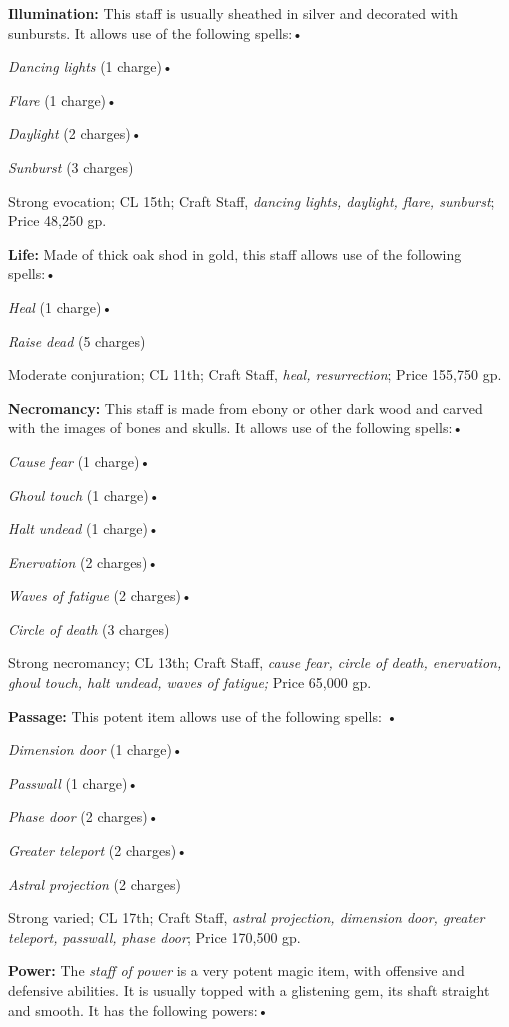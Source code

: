 \textbf{Illumination: }This staff is usually sheathed in silver and decorated with 
sunbursts. It allows use of the following spells:•

\textit{Dancing lights }(1 charge)•

\textit{Flare }(1 charge)•

\textit{Daylight }(2 charges)•

\textit{Sunburst }(3 charges)

Strong evocation; CL 15th; Craft Staff, \textit{dancing lights, daylight, flare, 
sunburst}; Price 48,250 gp.

\textbf{Life:} Made of thick oak shod in gold, this staff allows use of the following 
spells:•

\textit{Heal }(1 charge)•

\textit{Raise dead }(5 charges)

Moderate conjuration; CL 11th; Craft Staff, \textit{heal, resurrection}; Price 
155,750 gp.

\textbf{Necromancy: }This staff is made from ebony or other dark wood and carved 
with the images of bones and skulls. It allows use of the following spells:•

\textit{Cause fear }(1 charge)•

\textit{Ghoul touch }(1 charge)•

\textit{Halt undead }(1 charge)•

\textit{Enervation }(2 charges)•

\textit{Waves of fatigue }(2 charges)•

\textit{Circle of death }(3 charges)

Strong necromancy; CL 13th; Craft Staff, \textit{cause fear, circle of death, enervation, 
ghoul touch, halt undead, waves of fatigue; }Price 65,000 gp.

\textbf{Passage:} This potent item allows use of the following spells: •

\textit{Dimension door }(1 charge)•

\textit{Passwall }(1 charge)•

\textit{Phase door }(2 charges)•

\textit{Greater teleport }(2 charges)•

\textit{Astral projection }(2 charges)

Strong varied; CL 17th; Craft Staff, \textit{astral projection, dimension door, 
greater teleport, passwall, phase door}; Price 170,500 gp.

\textbf{Power:} The \textit{staff of power }is a very potent magic item, with offensive 
and defensive abilities. It is usually topped with a glistening gem, its shaft 
straight and smooth. It has the following powers:•

